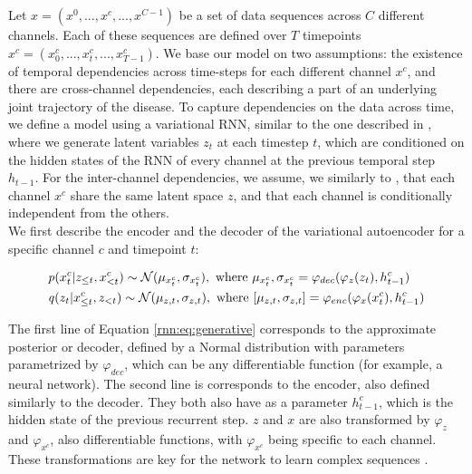 Let $x = (x^0,...,x^c,...,x^{C-1})$ be a set of data sequences across $C$ different channels. Each of these sequences are defined over $T$ timepoints  $x^c = (x^c_{0},...,x^c_{t},...,x^c_{T-1})$. We base our model on two assumptions: the existence of temporal dependencies across time-steps for each different channel $x^c$, and there are cross-channel dependencies, each describing a part of an underlying joint trajectory of the disease. To capture dependencies on the data across time, we define a model using a variational RNN, similar to the one described in \cite{Chung2015}, where we generate latent variables $z_t$ at each timestep $t$, which are conditioned on the hidden states of the RNN of every channel at the previous temporal step $h_{t-1}$. For the inter-channel dependencies, we assume, we similarly to \cite{Antelmi2019}, that each channel $x^c$ share the same latent space $z$, and that each channel is conditionally independent from the others. \\

We first describe the encoder and the decoder of the variational autoencoder for a specific channel $c$ and timepoint $t$:

\begin{equation} 
\begin{aligned} \label{rnn:eq:generative}
\displaystyle
& \mathit{p}(x^c_t | z_{\leq t}, x^c_{< t}) \sim \mathcal{N}(\mu_{x^c_t},\sigma_{x^c_t}), \text{ where } \mu_{x^c_t},\sigma_{x^c_t} = \varphi_{dec}(\varphi_{z}(z_t), h^c_{t-1}) \\
& \mathit{q}(z_t | x^c_{\leq t}, z_{< t}) \sim \mathcal{N}(\mu_{z,t},\sigma_{z,t}), \text{ where } [\mu_{z,t},\sigma_{z,t}] = \varphi_{enc}(\varphi_{x}(x^c_{t}), h^c_{t-1}) \\
\end{aligned}
\end{equation}

The first line of Equation \ref{rnn:eq:generative} corresponds to the approximate posterior or decoder, defined by a Normal distribution with parameters parametrized by $\varphi_{dec}$, which can be any differentiable function (for example, a neural network). The second line is corresponds to the encoder, also defined similarly to the decoder. They both also have as a parameter $h^c_{t-1}$, which is the hidden state of the previous recurrent step. $z$ and $x$ are also transformed by $\varphi_{z}$ and $\varphi_{x^c}$, also differentiable functions, with $\varphi_{x^c}$ being specific to each channel. These transformations are key for the network to learn complex sequences \cite{Chung2015}.\\

